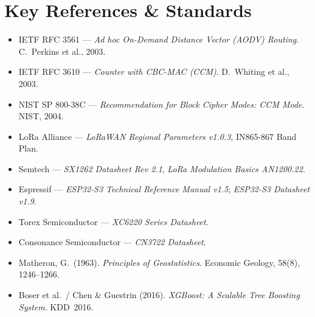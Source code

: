 \documentclass[12pt,a4paper]{article}
\begin{document}
\newpage
\section*{Key References \& Standards}

\begin{itemize}[leftmargin=*]
    \item IETF RFC 3561 --- \textit{Ad hoc On-Demand Distance Vector (AODV) Routing}. C.\ Perkins et al., 2003.
    \item IETF RFC 3610 --- \textit{Counter with CBC-MAC (CCM)}. D.\ Whiting et al., 2003.
    \item NIST SP 800-38C --- \textit{Recommendation for Block Cipher Modes: CCM Mode}. NIST, 2004.
    \item LoRa Alliance --- \textit{LoRaWAN Regional Parameters v1.0.3}, IN865-867 Band Plan.
    \item Semtech --- \textit{SX1262 Datasheet Rev 2.1}, \textit{LoRa Modulation Basics AN1200.22}.
    \item Espressif --- \textit{ESP32-S3 Technical Reference Manual v1.5}; \textit{ESP32-S3 Datasheet v1.9}.
    \item Torex Semiconductor --- \textit{XC6220 Series Datasheet}. 
    \item Consonance Semiconductor --- \textit{CN3722 Datasheet}.
    \item Matheron, G.\ (1963). \textit{Principles of Geostatistics}. Economic Geology, 58(8), 1246--1266.
    \item Boser et al.\ / Chen \& Guestrin (2016). \textit{XGBoost: A Scalable Tree Boosting System}. KDD~2016.
\end{itemize}
\end{document}
